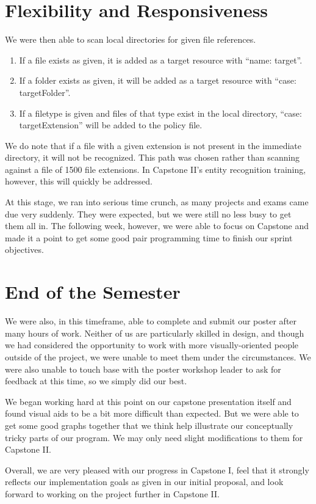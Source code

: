 \documentclass[12pt]{article}
\begin{document}
\section{Flexibility and Responsiveness}
We were then able to scan local directories for given file references.

\begin{enumerate}
   \item If a file exists as given, it is added as a target resource with “name: target”.
   \item If a folder exists as given, it will be added as a target resource with “case: targetFolder”.
   \item If a filetype is given and files of that type exist in the local directory, “case: targetExtension” will be added to the policy file.
\end{enumerate}

We do note that if a file with a given extension is not present in the immediate directory, it will not be recognized. This path was chosen rather than scanning against a file of 1500 file extensions. In Capstone II's entity recognition training, however, this will quickly be addressed.

At this stage, we ran into serious time crunch, as many projects and exams came due very suddenly. They were expected, but we were still no less busy to get them all in. The following week, however, we were able to focus on Capstone and made it a point to get some good pair programming time to finish our sprint objectives.

\section{End of the Semester}
We were also, in this timeframe, able to complete and submit our poster after many hours of work. Neither of us are particularly skilled in design, and though we had considered the opportunity to work with more visually-oriented people outside of the project, we were unable to meet them under the circumstances. We were also unable to touch base with the poster workshop leader to ask for feedback at this time, so we simply did our best.

We began working hard at this point on our capstone presentation itself and found visual aids to be a bit more difficult than expected. But we were able to get some good graphs together that we think help illustrate our conceptually tricky parts of our program. We may only need slight modifications to them for Capstone II.

Overall, we are very pleased with our progress in Capstone I, feel that it strongly reflects our implementation goals as given in our initial proposal, and look forward to working on the project further in Capstone II.
\end{document}
